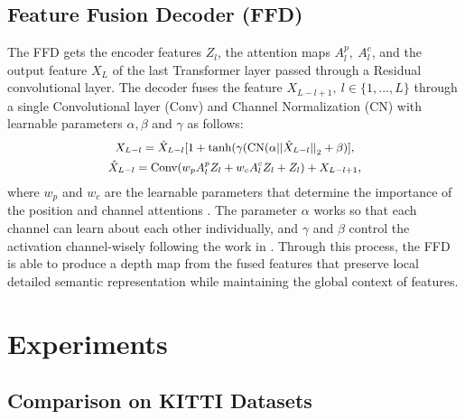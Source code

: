 \documentclass[letterpaper]{article} \usepackage{aaai23}  \usepackage{times}  \usepackage{helvet}  \usepackage{courier}  \usepackage[hyphens]{url}  \usepackage{graphicx} \urlstyle{rm} \def\UrlFont{\rm}  \usepackage{natbib}  \usepackage{caption} \frenchspacing  \setlength{\pdfpagewidth}{8.5in} \setlength{\pdfpageheight}{11in} \usepackage{algorithm}
\begin{document}
\subsection{Feature Fusion Decoder (FFD)}
\label{sec:FFD}
The FFD gets the encoder features $Z_l$, the attention maps $A^p_l,~A^c_l$, and the output feature $X_L$ of the last Transformer layer passed through a Residual convolutional layer. 
The decoder fuses the feature $X_{L-l+1},~l \in \{1,...,L\}$ through a single Convolutional layer (Conv) and Channel Normalization (CN) with learnable parameters $\alpha, \beta$ and $\gamma$ as follows:
\begin{equation}
\small
\begin{gathered}
    X_{L-l} = \hat{X}_{L-l}[1+\tanh(\gamma(\text{CN}(\alpha||\hat{X}_{L-l}{||}_2  + \beta )],
    \\
    \hat{X}_{L-l} = \text{Conv}(w_pA^p_lZ_l + w_cA^c_lZ_l + Z_l) + X_{L-l+1},
\end{gathered}
\end{equation}
where $w_{p}$ and $w_c$ are the learnable parameters that determine the importance of the position and channel attentions \cite{zhang2019self}.
The parameter $\alpha$ works so that each channel can learn about each other individually, and $\gamma$ and $\beta$ control the activation channel-wisely following the work in \cite{yang2020gated}. 
Through this process, the FFD is able to produce a depth map from the fused features that preserve local detailed semantic representation while maintaining the global context of features.

\section{Experiments}

\subsection{Comparison on KITTI Datasets}
\label{sec_KITTI}
\end{document}
